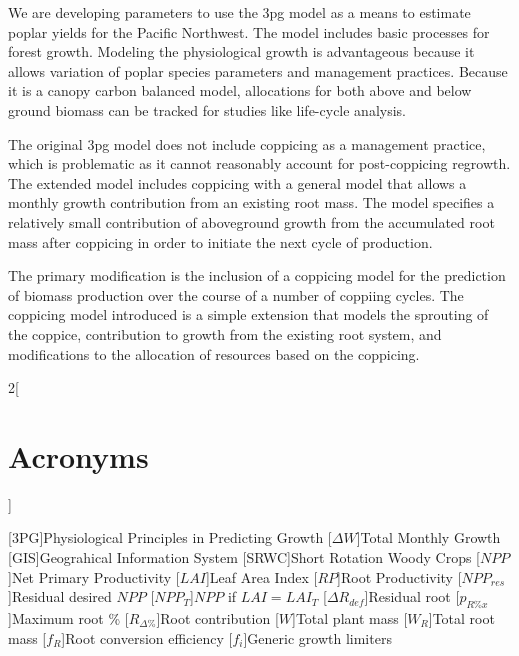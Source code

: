 \documentclass[10pt]{article}
\begin{document}
We are developing parameters to use the \acf{3pg} model as a means to
estimate poplar yields for the Pacific Northwest.  The model includes
basic processes for forest growth.  Modeling the physiological growth
is advantageous because it allows variation of poplar species
parameters and management practices.  Because it is a canopy carbon
balanced model, allocations for both above and below ground biomass
can be tracked for studies like life-cycle analysis.

The original \ac{3pg} model does not include coppicing as a management
practice, which is problematic as it cannot reasonably account for
post-coppicing regrowth.  The extended model includes coppicing with a
general model that allows a monthly growth contribution from an
existing root mass.  The model specifies a relatively small
contribution of aboveground growth from the accumulated root mass
after coppicing in order to initiate the next cycle of production.

The primary modification is the inclusion of a coppicing model for the
prediction of biomass production over the course of a number of
coppiing cycles.  The coppicing model introduced is a simple extension
that models the sprouting of the coppice, contribution to growth from
the existing root system, and modifications to the allocation of
resources based on the coppicing.



\begin{multicols}{2}[\section*{Acronyms}]
{\normalsize
\raggedright
\begin{acronym}
[\textsc{3PG}]{Physiological Principles in Predicting Growth}
[\ensuremath{\Delta W}]{Total Monthly Growth}
[\textsc{GIS}]{Geograhical Information System}
[\textsc{SRWC}]{Short Rotation Woody Crops}
[\ensuremath{NPP}]{Net Primary Productivity}
[\ensuremath{LAI}]{Leaf Area Index}
[\ensuremath{RP}]{Root Productivity}
[\ensuremath{NPP_{res}}]{Residual desired $NPP$}
[\ensuremath{NPP_{T}}]{$NPP$ if $LAI = LAI_{T}$}
[\ensuremath{\Delta R_{def}}]{Residual root}
[\ensuremath{p_{R\%x}}]{Maximum root \%}
[\ensuremath{R_{\Delta\%}}]{Root contribution}
[\ensuremath{W}]{Total plant mass}
[\ensuremath{W_R}]{Total root mass}
[\ensuremath{f_R}]{Root conversion efficiency}
[\ensuremath{f_i}]{Generic growth limiters}
\end{acronym}
}
\end{multicols}
\end{document}
